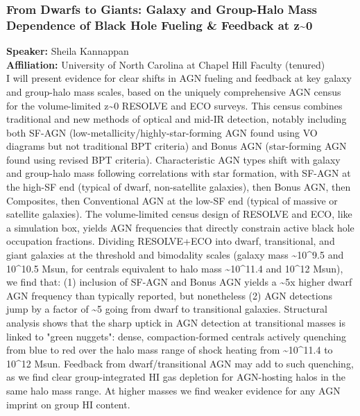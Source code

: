 \hypertarget{abs-53}{}
\subsubsection*{From Dwarfs to Giants: Galaxy and Group-Halo Mass Dependence of Black Hole Fueling \& Feedback at z\textasciitilde{}0}
\textbf{Speaker:} Sheila Kannappan \\
\textbf{Affiliation:} University of North Carolina at Chapel Hill \textperiodcentered{} Faculty (tenured)\\
I will present evidence for clear shifts in AGN fueling and feedback at key galaxy and group-halo mass scales, based on the uniquely comprehensive AGN census for the volume-limited z\textasciitilde{}0 RESOLVE and ECO surveys. This census combines traditional and new methods of optical and mid-IR detection, notably including both SF-AGN (low-metallicity/highly-star-forming AGN found using VO diagrams but not traditional BPT criteria) and Bonus AGN (star-forming AGN found using revised BPT criteria). Characteristic AGN types shift with galaxy and group-halo mass following correlations with star formation, with SF-AGN at the high-SF end (typical of dwarf, non-satellite galaxies), then Bonus AGN, then Composites, then Conventional AGN at the low-SF end (typical of massive or satellite galaxies). The volume-limited census design of RESOLVE and ECO, like a simulation box, yields AGN frequencies that directly constrain active black hole occupation fractions. Dividing RESOLVE+ECO into dwarf, transitional, and giant galaxies at the threshold and bimodality scales (galaxy mass \textasciitilde{}10\textasciicircum{}9.5 and 10\textasciicircum{}10.5 Msun, for centrals equivalent to halo mass \textasciitilde{}10\textasciicircum{}11.4 and 10\textasciicircum{}12 Msun), we find that: (1) inclusion of SF-AGN and Bonus AGN yields a \textasciitilde{}5x higher dwarf AGN frequency than typically reported, but nonetheless (2) AGN detections jump by a factor of \textasciitilde{}5 going from dwarf to transitional galaxies. Structural analysis shows that the sharp uptick in AGN detection at transitional masses is linked to "green nuggets": dense, compaction-formed centrals actively quenching from blue to red over the halo mass range of shock heating from \textasciitilde{}10\textasciicircum{}11.4 to 10\textasciicircum{}12 Msun. Feedback from dwarf/transitional AGN may add to such quenching, as we find clear group-integrated HI gas depletion for AGN-hosting halos in the same halo mass range. At higher masses we find weaker evidence for any AGN imprint on group HI content.

